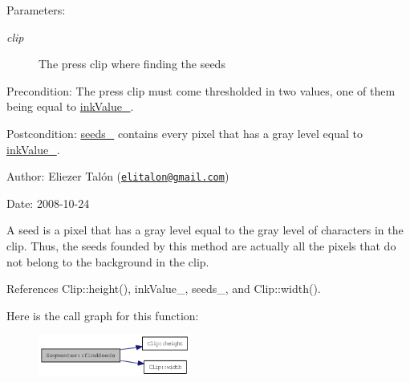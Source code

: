 \begin{Desc}
\item[Parameters:]
\begin{description}
\item[{\em clip}]The press clip where finding the seeds\end{description}
\end{Desc}
\begin{Desc}
\item[Precondition:]The press clip must come thresholded in two values, one of them being equal to \hyperlink{class_segmenter_fa6183f99aa6011399783652b341a43b}{inkValue\_\-}.\end{Desc}
\begin{Desc}
\item[Postcondition:]\hyperlink{class_segmenter_7859d050250b9fdf7c96374f80008d6e}{seeds\_\-} contains every pixel that has a gray level equal to \hyperlink{class_segmenter_fa6183f99aa6011399783652b341a43b}{inkValue\_\-}.\end{Desc}
\begin{Desc}
\item[Author:]Eliezer Talón (\href{mailto:elitalon@gmail.com}{\tt elitalon@gmail.com}) \end{Desc}
\begin{Desc}
\item[Date:]2008-10-24\end{Desc}
A seed is a pixel that has a gray level equal to the gray level of characters in the clip. Thus, the seeds founded by this method are actually all the pixels that do not belong to the background in the clip. 

References Clip::height(), inkValue\_\-, seeds\_\-, and Clip::width().

Here is the call graph for this function:\nopagebreak
\begin{figure}[H]
\begin{center}
\leavevmode
\includegraphics[width=142pt]{class_segmenter_bacab187b543a51c5322c01fc0a29ffb_cgraph}
\end{center}
\end{figure}


